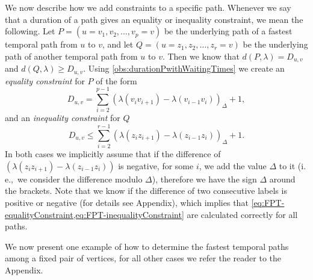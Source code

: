 \documentclass[a4paper,UKenglish,cleveref, autoref, thm-restate,anonymous]{lipics-v2021}
\newcommand{\ie}{i.\,e.,\ }
\begin{document}
We now describe how we add constraints to a specific path. Whenever we say that a duration of a path gives an equality or inequality constraint, we mean the following.
Let $P=(u=v_1,v_2, \dots, v_p = v)$ be the underlying path of a fastest temporal path from $u$ to $v$,
and let $Q = (u=z_1,z_2, \dots, z_r = v)$ be the underlying path of another temporal path from $u$ to $v$.
Then we know that $d(P,\lambda) = D_{u,v}$ and $d(Q, \lambda) \geq D_{u,v}$.
Using \cref{obs:durationPwithWaitingTimes}
we create an \emph{equality constraint} for $P$
of the form 
\begin{equation}\label{eq:FPT-equalityConstraint}
    D_{u,v} = \sum _ {i=2} ^ {p-1} (\lambda (v_{i}v_{i+1}) - \lambda (v_{i-1}v_i))_\Delta + 1,
\end{equation}
and an \emph{inequality constraint} for $Q$ 
\begin{equation}\label{eq:FPT-inequalityConstraint}
    D_{u,v} \leq \sum _ {i=2} ^ {r-1} (\lambda (z_{i}z_{i+1}) - \lambda (z_{i-1}z_i))_\Delta + 1.
\end{equation}
In both cases we implicitly assume that if the difference of $(\lambda (z_{i}z_{i+1}) - \lambda (z_{i-1}z_i))$ is negative, for some $i$, we add the value $\Delta$ to it (\ie we consider the difference modulo $\Delta$), therefore we have the sign $\Delta$ around the brackets.
Note that we know if the difference of two consecutive labels is positive or negative (for details see Appendix),
which implies that \cref{eq:FPT-equalityConstraint,eq:FPT-inequalityConstraint} are calculated correctly for all paths.

We now present one example of how to determine the fastest temporal paths among a fixed pair of vertices, for all other cases we refer the reader to the Appendix.
\end{document}
